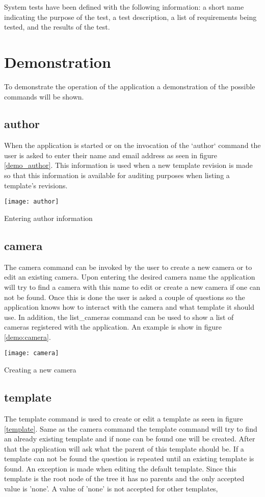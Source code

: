 System tests have been defined with the following information: a short name indicating the purpose of the test, a test description, a list of requirements being tested, and the results of the test.



\section{Demonstration}
To demonstrate the operation of the application a demonstration of the possible commands will be shown.

\subsection{author}
When the application is started or on the invocation of the `author` command the user is asked to enter their name and email address as seen in figure \ref{demo_author}.
This information is used when a new template revision is made so that this information is available for auditing purposes when listing a template's revisions.
\begin{marginfigure}
	\texttt{[image: author]}
	\caption{Entering author information}
	\label{demo_author}
\end{marginfigure}

\subsection{camera}
The camera command can be invoked by the user to create a new camera or to edit an existing camera.
Upon entering the desired camera name the application will try to find a camera with this name to edit or create a new camera if one can not be found.
Once this is done the user is asked a couple of questions so the application knows how to interact with the camera and what template it should use.
In addition, the list\_cameras command can be used to show a list of cameras registered with the application.
An example is show in figure \ref{demo:camera}.
\begin{marginfigure}
	\texttt{[image: camera]}
	\caption{Creating a new camera}
	\label{demo:camera}
\end{marginfigure}

\subsection{template}
The template command is used to create or edit a template as seen in figure \ref{template}.
Same as the camera command the template command will try to find an already existing template and if none can be found one will be created.
After that the application will ask what the parent of this template should be.
If a template can not be found the question is repeated until an existing template is found.
An exception is made when editing the default template.
Since this template is the root node of the tree it has no parents and the only accepted value is 'none'.
A value of 'none' is not accepted for other templates,

